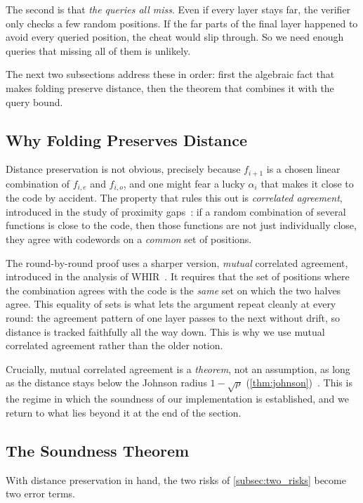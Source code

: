 The second is that \emph{the queries all miss}. Even if every layer stays
far, the verifier only checks a few random positions. If the far parts of
the final layer happened to avoid every queried position, the cheat would
slip through. So we need enough queries that missing all of them is
unlikely.

The next two subsections address these in order: first the algebraic fact
that makes folding preserve distance, then the theorem that combines it
with the query bound.


\subsection{Why Folding Preserves Distance}
\label{subsec:mca}

Distance preservation is not obvious, precisely because $f_{i+1}$ is a
chosen linear combination of $f_{i,e}$ and $f_{i,o}$, and one might fear a
lucky $\alpha_i$ that makes it close to the code by accident. The property
that rules this out is \emph{correlated agreement}, introduced in the
study of proximity gaps~\cite{BCIKS20}: if a random combination of several
functions is close to the code, then those functions are not just
individually close, they agree with codewords on a \emph{common} set of
positions.

The round-by-round proof uses a sharper version, \emph{mutual} correlated
agreement, introduced in the analysis of WHIR~\cite{WHIR24}. It requires
that the set of positions where the combination agrees with the code is
the \emph{same} set on which the two halves agree. 
This equality of sets is what lets the argument repeat cleanly at
every round: the agreement pattern of one layer passes to the next
without drift, so distance is tracked faithfully all the way down. This is
why we use mutual correlated agreement rather than the older notion.

Crucially, mutual correlated agreement is a \emph{theorem}, not an
assumption, as long as the distance stays below the Johnson radius
$1 - \sqrt{\rho}$ (\cref{thm:johnson})~\cite{GMW25}. This is the regime in
which the soundness of our implementation is established, and we return to
what lies beyond it at the end of the section.


\subsection{The Soundness Theorem}
\label{subsec:rbr}

With distance preservation in hand, the two risks of
\cref{subsec:two_risks} become two error terms.

